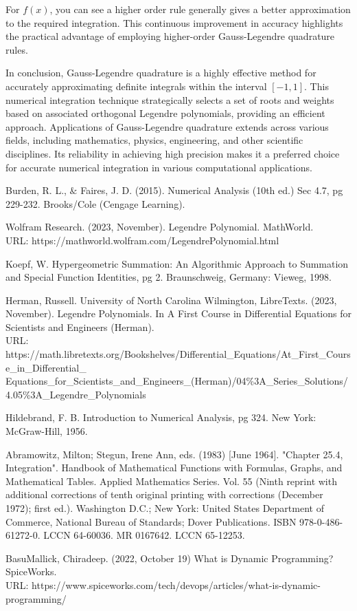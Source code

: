 \documentclass[twoside]{article}
\begin{document}
For \(f(x)\), you can see a higher order rule generally gives a better approximation to the required integration. This continuous improvement in accuracy highlights the practical advantage of employing higher-order Gauss-Legendre quadrature rules.

In conclusion, Gauss-Legendre quadrature is a highly effective method for accurately approximating definite integrals within the interval \([-1, 1]\). This numerical integration technique strategically selects a set of roots and weights based on associated orthogonal Legendre polynomials, providing an efficient approach. Applications of Gauss-Legendre quadrature extends across various fields, including mathematics, physics, engineering, and other scientific disciplines. Its reliability in achieving high precision makes it a preferred choice for accurate numerical integration in various computational applications.
\newpage


\begin{thebibliography}{9}
Burden, R. L., \(\&\) Faires, J. D. (2015). Numerical Analysis (10th ed.) Sec 4.7, pg 229-232. Brooks/Cole (Cengage Learning).

Wolfram Research. (2023, November). Legendre Polynomial. MathWorld.\\ URL: https://mathworld.wolfram.com/LegendrePolynomial.html

Koepf, W. Hypergeometric Summation: An Algorithmic Approach to Summation and Special Function Identities, pg 2. Braunschweig, Germany: Vieweg, 1998.

Herman, Russell. University of North Carolina Wilmington, LibreTexts. (2023, November). Legendre Polynomials. In A First Course in Differential Equations for Scientists and Engineers (Herman). \\ URL: https://math.libretexts.org/Bookshelves/Differential\_Equations/At\_First\_Course\_in\_Differential\_
Equations\_for\_Scientists\_and\_Engineers\_(Herman)/04\%3A\_Series\_Solutions/4.05\%3A\_Legendre\_Polynomials

Hildebrand, F. B. Introduction to Numerical Analysis, pg 324. New York: McGraw-Hill, 1956.

Abramowitz, Milton; Stegun, Irene Ann, eds. (1983) [June 1964]. "Chapter 25.4, Integration". Handbook of Mathematical Functions with Formulas, Graphs, and Mathematical Tables. Applied Mathematics Series. Vol. 55 (Ninth reprint with additional corrections of tenth original printing with corrections (December 1972); first ed.). Washington D.C.; New York: United States Department of Commerce, National Bureau of Standards; Dover Publications. ISBN 978-0-486-61272-0. LCCN 64-60036. MR 0167642. LCCN 65-12253.

BasuMallick,  Chiradeep. (2022, October 19) What is Dynamic Programming? SpiceWorks. \\ URL: https://www.spiceworks.com/tech/devops/articles/what-is-dynamic-programming/

\end{thebibliography}
\end{document}
